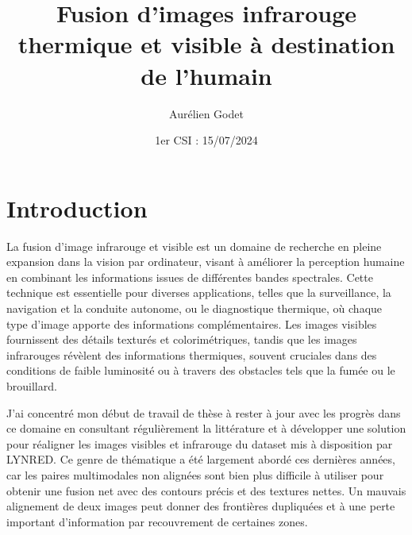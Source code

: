 \documentclass[12pt]{article}
\title{Fusion d'images infrarouge thermique et visible à destination de l'humain}
\author{Aurélien Godet}
\date{1er CSI : 15/07/2024}
\begin{document}
\maketitle

\printglossary[type=\acronymtype, title=Liste des Acronymes]
\printglossary[type=main,title=Glossaire]


\printbibliography

\newpage
\section{Introduction}
La fusion d'image infrarouge et visible est un domaine de recherche 
en pleine expansion dans la vision par ordinateur, visant à améliorer 
la perception humaine en combinant les informations issues de différentes 
bandes spectrales. Cette technique est essentielle pour diverses applications, 
telles que la surveillance, la navigation et la conduite autonome, 
ou le diagnostique thermique, où chaque type d'image apporte des informations 
complémentaires. Les images visibles fournissent des détails texturés et 
colorimétriques, tandis que les images infrarouges révèlent des informations 
thermiques, souvent cruciales dans des conditions de faible luminosité ou à 
travers des obstacles tels que la fumée ou le brouillard.

J'ai concentré mon début de travail de thèse à rester à jour avec les progrès dans 
ce domaine en consultant régulièrement la littérature et à développer une solution 
pour réaligner les images visibles et infrarouge du dataset mis à disposition par LYNRED.
Ce genre de thématique a été largement abordé ces dernières années, car les paires multimodales
non alignées sont bien plus difficile à utiliser pour obtenir une fusion net avec des
contours précis et des textures nettes. Un mauvais alignement de deux images peut donner des frontières 
dupliquées et à une perte important d'information par recouvrement de certaines zones.
\end{document}
